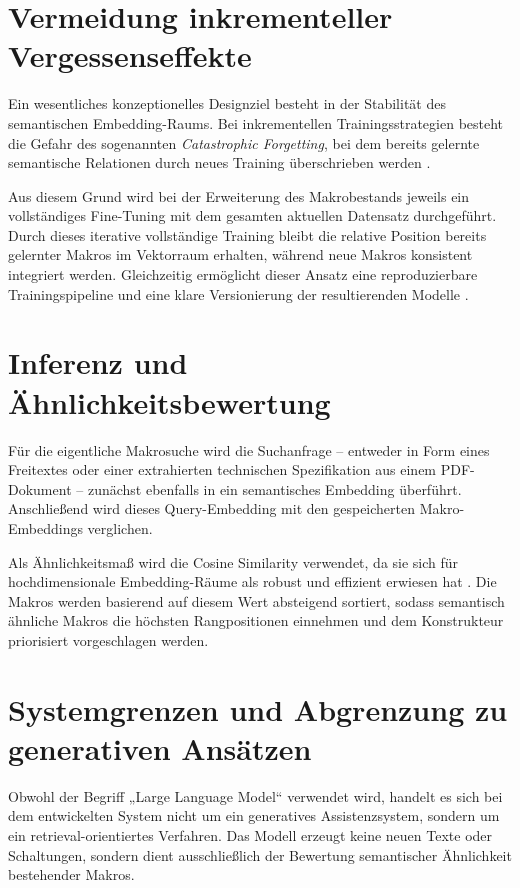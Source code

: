 \section{Vermeidung inkrementeller Vergessenseffekte}

Ein wesentliches konzeptionelles Designziel besteht in der Stabilität des semantischen Embedding-Raums. Bei inkrementellen Trainingsstrategien besteht die Gefahr des sogenannten \emph{Catastrophic Forgetting}, bei dem bereits gelernte semantische Relationen durch neues Training überschrieben werden \cite{zhong_kaft_2025}.

Aus diesem Grund wird bei der Erweiterung des Makrobestands jeweils ein vollständiges Fine-Tuning mit dem gesamten aktuellen Datensatz durchgeführt. Durch dieses iterative vollständige Training bleibt die relative Position bereits gelernter Makros im Vektorraum erhalten, während neue Makros konsistent integriert werden. Gleichzeitig ermöglicht dieser Ansatz eine reproduzierbare Trainingspipeline und eine klare Versionierung der resultierenden Modelle \cite{bansal_refining_2025}.

\section{Inferenz und Ähnlichkeitsbewertung}

Für die eigentliche Makrosuche wird die Suchanfrage – entweder in Form eines Freitextes oder einer extrahierten technischen Spezifikation aus einem PDF-Dokument – zunächst ebenfalls in ein semantisches Embedding überführt. Anschließend wird dieses Query-Embedding mit den gespeicherten Makro-Embeddings verglichen.

Als Ähnlichkeitsmaß wird die Cosine Similarity verwendet, da sie sich für hochdimensionale Embedding-Räume als robust und effizient erwiesen hat \cite{mishra_similarity_2020}. Die Makros werden basierend auf diesem Wert absteigend sortiert, sodass semantisch ähnliche Makros die höchsten Rangpositionen einnehmen und dem Konstrukteur priorisiert vorgeschlagen werden.

\section{Systemgrenzen und Abgrenzung zu generativen Ansätzen}

Obwohl der Begriff „Large Language Model“ verwendet wird, handelt es sich bei dem entwickelten System nicht um ein generatives Assistenzsystem, sondern um ein retrieval-orientiertes Verfahren. Das Modell erzeugt keine neuen Texte oder Schaltungen, sondern dient ausschließlich der Bewertung semantischer Ähnlichkeit bestehender Makros.

